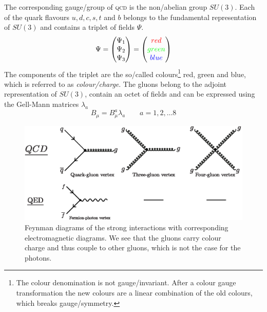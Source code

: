 \documentclass[../../index.tex]{subfiles}
\begin{document}
The corresponding gauge\-/group of \textsc{qcd} is the non\-/abelian group
$SU(3)$. Each of the quark flavours $u,d,c,s,t$ and $b$ belongs to the
fundamental representation of $SU(3)$ and contains a triplet of fields $\Psi$.
\begin{equation}
  \Psi = \begin{pmatrix} \Psi_1 \\ \Psi_2 \\ \Psi_3 \end{pmatrix}
  = \begin{pmatrix} \textcolor{red}{red} \\ \textcolor{green}{green} \\ \textcolor{blue}{blue} \end{pmatrix}
\end{equation}
The components of the triplet are the so\-/called colours\footnote{The colour
  denomination is not gauge\-/invariant. After a colour gauge transformation the
  new colours are a linear combination of the old colours, which breaks
  gauge\-/symmetry.} red, green and blue, which is referred to as
\textit{colour\-/charge}. The gluons belong to the adjoint representation of
$SU(3)$, contain an octet of fields and can be expressed using the Gell-Mann
matrices $\lambda_a$
\begin{equation}
  B_\mu = B_\mu^a \lambda_a \qquad a = 1,2,\dotsc 8
\end{equation}
\begin{figure}
  \centering \includegraphics[width=\textwidth]{./images/qcdFeynmanDiagrams.eps}
  \caption{Feynman diagrams of the strong interactions with corresponding
    electromagnetic diagrams. We see that the gluons carry colour charge and
    thus couple to other gluons, which is not the case for the photons.}
  \label{fig:qcdFeynmanDiagrams}
\end{figure}
\end{document}
